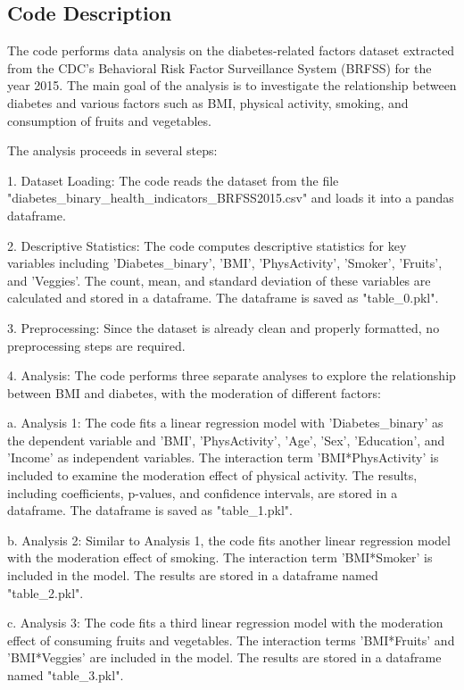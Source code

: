 \documentclass[11pt]{article}
\begin{document}
\subsection{Code Description}

The code performs data analysis on the diabetes-related factors dataset extracted from the CDC's Behavioral Risk Factor Surveillance System (BRFSS) for the year 2015. The main goal of the analysis is to investigate the relationship between diabetes and various factors such as BMI, physical activity, smoking, and consumption of fruits and vegetables.

The analysis proceeds in several steps:

1. Dataset Loading: The code reads the dataset from the file "diabetes\_binary\_health\_indicators\_BRFSS2015.csv" and loads it into a pandas dataframe.

2. Descriptive Statistics: The code computes descriptive statistics for key variables including 'Diabetes\_binary', 'BMI', 'PhysActivity', 'Smoker', 'Fruits', and 'Veggies'. The count, mean, and standard deviation of these variables are calculated and stored in a dataframe. The dataframe is saved as "table\_0.pkl".

3. Preprocessing: Since the dataset is already clean and properly formatted, no preprocessing steps are required.

4. Analysis: The code performs three separate analyses to explore the relationship between BMI and diabetes, with the moderation of different factors:

   a. Analysis 1: The code fits a linear regression model with 'Diabetes\_binary' as the dependent variable and 'BMI', 'PhysActivity', 'Age', 'Sex', 'Education', and 'Income' as independent variables. The interaction term 'BMI*PhysActivity' is included to examine the moderation effect of physical activity. The results, including coefficients, p-values, and confidence intervals, are stored in a dataframe. The dataframe is saved as "table\_1.pkl".

   b. Analysis 2: Similar to Analysis 1, the code fits another linear regression model with the moderation effect of smoking. The interaction term 'BMI*Smoker' is included in the model. The results are stored in a dataframe named "table\_2.pkl".

   c. Analysis 3: The code fits a third linear regression model with the moderation effect of consuming fruits and vegetables. The interaction terms 'BMI*Fruits' and 'BMI*Veggies' are included in the model. The results are stored in a dataframe named "table\_3.pkl".
\end{document}
